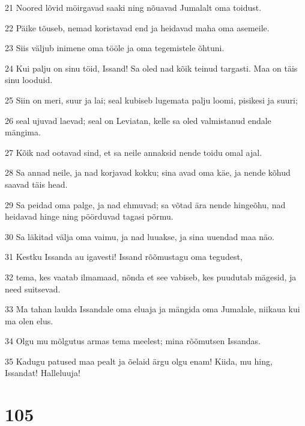 \par 21 Noored lõvid möirgavad saaki ning nõuavad Jumalalt oma toidust.
\par 22 Päike tõuseb, nemad koristavad end ja heidavad maha oma asemeile.
\par 23 Siis väljub inimene oma tööle ja oma tegemistele õhtuni.
\par 24 Kui palju on sinu töid, Issand! Sa oled nad kõik teinud targasti. Maa on täis sinu looduid.
\par 25 Siin on meri, suur ja lai; seal kubiseb lugemata palju loomi, pisikesi ja suuri;
\par 26 seal ujuvad laevad; seal on Leviatan, kelle sa oled valmistanud endale mängima.
\par 27 Kõik nad ootavad sind, et sa neile annaksid nende toidu omal ajal.
\par 28 Sa annad neile, ja nad korjavad kokku; sina avad oma käe, ja nende kõhud saavad täis head.
\par 29 Sa peidad oma palge, ja nad ehmuvad; sa võtad ära nende hingeõhu, nad heidavad hinge ning pöörduvad tagasi põrmu.
\par 30 Sa läkitad välja oma vaimu, ja nad luuakse, ja sina uuendad maa näo.
\par 31 Kestku Issanda au igavesti! Issand rõõmustagu oma tegudest,
\par 32 tema, kes vaatab ilmamaad, nõnda et see vabiseb, kes puudutab mägesid, ja need suitsevad.
\par 33 Ma tahan laulda Issandale oma eluaja ja mängida oma Jumalale, niikaua kui ma olen elus.
\par 34 Olgu mu mõlgutus armas tema meelest; mina rõõmutsen Issandas.
\par 35 Kadugu patused maa pealt ja õelaid ärgu olgu enam! Kiida, mu hing, Issandat! Halleluuja!

\chapter{105}

